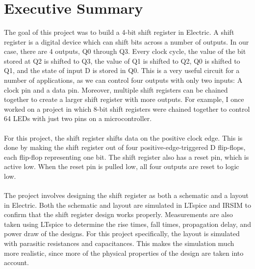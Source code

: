 \documentclass{article}
\begin{document}



\tableofcontents

\newpage
{}

\section{Executive Summary}
  \paragraph{}
  The goal of this project was to build a 4-bit shift register in Electric. A shift register is a digital device which can shift bits across a number of outputs. In our case, there are 4 outputs, Q0 through Q3. Every clock cycle, the value of the bit stored at Q2 is shifted to Q3, the value of Q1 is shifted to Q2, Q0 is shifted to Q1, and the state of input D is stored in Q0. This is a very useful circuit for a number of applications, as we can control four outputs with only two inputs: A clock pin and a data pin. Moreover, multiple shift registers can be chained together to create a larger shift register with more outputs. For example, I once worked on a project in which 8-bit shift registers were chained together to control 64 LEDs with just two pins on a microcontroller.

  \paragraph{}
  For this project, the shift register shifts data on the positive clock edge. This is done by making the shift register out of four positive-edge-triggered D flip-flops, each flip-flop representing one bit. The shift register also has a reset pin, which is active low. When the reset pin is pulled low, all four outputs are reset to logic low.

  \paragraph{}
  The project involves designing the shift register as both a schematic and a layout in Electric. Both the schematic and layout are simulated in LTspice and IRSIM to confirm that the shift register design works properly. Measurements are also taken using LTspice to determine the rise times, fall times, propagation delay, and power draw of the designs. For this project specifically, the layout is simulated with parasitic resistances and capacitances. This makes the simulation much more realistic, since more of the physical properties of the design are taken into account.
\end{document}
